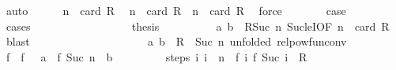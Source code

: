 \begin{isabellebody}
\ auto\isanewline
\ \ \ \ \isamarkupfalse%
\ {\isacartoucheopen}n\ {\isasymle}\ card\ R{\isacartoucheclose}\ \isamarkupfalse%
\ {\isachardoublequoteopen}n\ {\isacharless}{\kern0pt}\ card\ R{\isachardoublequoteclose}\ {\isacharbar}{\kern0pt}\ {\isachardoublequoteopen}n\ {\isacharequal}{\kern0pt}\ card\ R{\isachardoublequoteclose}\ \isamarkupfalse%
\ force\isanewline
\ \ \ \ \isamarkupfalse%
\ \isamarkupfalse%
\ {\isacharquery}{\kern0pt}case\isanewline
\ \ \ \ \isamarkupfalse%
\ cases\isanewline
\ \ \ \ \ \ \isamarkupfalse%
\ {}\isanewline
\ \ \ \ \ \ \isamarkupfalse%
\ \isamarkupfalse%
\ {\isacharquery}{\kern0pt}thesis\isanewline
\ \ \ \ \ \ \ \ \isamarkupfalse%
\ {\isacartoucheopen}{\isacharparenleft}{\kern0pt}a{\isacharcomma}{\kern0pt}\ b{\isacharparenright}{\kern0pt}\ {\isasymin}\ R{\isacharcircum}{\kern0pt}{\isacharcircum}{\kern0pt}{\isacharparenleft}{\kern0pt}Suc\ n{\isacharparenright}{\kern0pt}{\isacartoucheclose}\ Suc{\isacharunderscore}{\kern0pt}leI{\isacharbrackleft}{\kern0pt}OF\ {\isacartoucheopen}n\ {\isacharless}{\kern0pt}\ card\ R{\isacartoucheclose}{\isacharbrackright}{\kern0pt}\ \isamarkupfalse%
\ blast\isanewline
\ \ \ \ \isamarkupfalse%
\isanewline
\ \ \ \ \ \ \isamarkupfalse%
\ {}\isanewline
\ \ \ \ \ \ \isamarkupfalse%
\ {\isacartoucheopen}{\isacharparenleft}{\kern0pt}a{\isacharcomma}{\kern0pt}\ b{\isacharparenright}{\kern0pt}\ {\isasymin}\ R\ {\isacharcircum}{\kern0pt}{\isacharcircum}{\kern0pt}\ {\isacharparenleft}{\kern0pt}Suc\ n{\isacharparenright}{\kern0pt}{\isacartoucheclose}\ {\isacharbrackleft}{\kern0pt}unfolded\ relpow{\isacharunderscore}{\kern0pt}fun{\isacharunderscore}{\kern0pt}conv{\isacharbrackright}{\kern0pt}\isanewline
\ \ \ \ \ \ \isamarkupfalse%
\ f\ \ {\isachardoublequoteopen}f\ {}\ {\isacharequal}{\kern0pt}\ a{\isachardoublequoteclose}\ \ {\isachardoublequoteopen}f\ {\isacharparenleft}{\kern0pt}Suc\ n{\isacharparenright}{\kern0pt}\ {\isacharequal}{\kern0pt}\ b{\isachardoublequoteclose}\isanewline
\ \ \ \ \ \ \ \ \ steps{\isacharcolon}{\kern0pt}\ {\isachardoublequoteopen}{\isasymAnd}i{\isachardot}{\kern0pt}\ i\ {\isasymle}\ n\ {\isasymLongrightarrow}\ {\isacharparenleft}{\kern0pt}f\ i{\isacharcomma}{\kern0pt}\ f\ {\isacharparenleft}{\kern0pt}Suc\ i{\isacharparenright}{\kern0pt}{\isacharparenright}{\kern0pt}\ {\isasymin}\ R{\isachardoublequoteclose}\ \isamarkupfalse%

\end{isabellebody}
